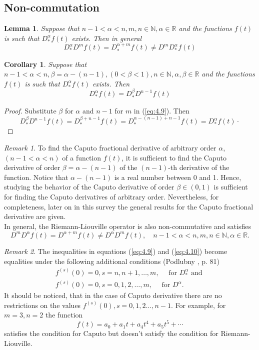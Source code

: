\documentclass[a4paper,14pt,oneside]{book}
\theoremstyle{plain}
\newtheorem{lem}[thm]{Lemma}
\newtheorem{cor}{Corollary}[thm]
\theoremstyle{definition}
\theoremstyle{remark}
\newtheorem{rmk}{Remark}[section]
\begin{document}
\begin{center}
\begin{flushleft}
{\subsection{Non-commutation}
\begin{lem}
Suppose that $n-1<\alpha<n, m, n \in \mathbb{N}, \alpha \in \mathbb{R}$ and the functions $f(t)$ is such that $D_{*}^{\alpha} f(t)$ exists. Then in general
\begin{equation}\label{eq:4.9}
D_{*}^{\alpha} D^{m} f(t)=D_{*}^{\alpha+m} f(t) \neq D^{m} D_{*}^{\alpha} f(t)
\end{equation}
\end{lem}
\begin{cor} 
Suppose that $n-1<\alpha<n, \beta=\alpha-(n-1),(0<\beta<1), n \in \mathbb{N}, \alpha, \beta \in \mathbb{R}$ and the functions $f(t)$ is such that $D_{*}^{\alpha} f(t)$ exists. Then
$$
D_{*}^{\alpha} f(t)=D_{*}^{\beta} D^{n-1} f(t)
$$
\end{cor}
\begin{proof}
Substitute $\beta$ for $\alpha$ and $n-1$ for $m$ in (\ref{eq:4.9}). Then
$$
D_{*}^{\beta} D^{n-1} f(t)=D_{*}^{\beta+n-1} f(t)=D_{*}^{\alpha-(n-1)+n-1} f(t)=D_{*}^{\alpha} f(t)\cdot 
$$
\end{proof}
\begin{rmk}
To find the Caputo fractional derivative of arbitrary order $\alpha$, $(n-1<\alpha<n)$ of a function $f(t)$, it is sufficient to find the Caputo derivative of order $\beta=\alpha-(n-1)$ of the $(n-1)$-th derivative of the function. Notice that $\alpha-(n-1)$ is a real number between 0 and 1. Hence, studying the behavior of the Caputo derivative of order $\beta \in(0,1)$ is sufficient for finding the Caputo derivatives of arbitrary order. Nevertheless, for completeness, later on in this survey the general results for the Caputo fractional derivative are given.\\
In general, the Riemann-Liouville operator is also non-commutative and satisfies
\begin{equation}\label{eq:4.10}
D^{m} D^{\alpha} f(t)=D^{\alpha+m} f(t) \neq D^{\alpha} D^{m} f(t), \quad n-1<\alpha<n, m, n \in \mathbb{N}, \alpha \in \mathbb{R} .
\end{equation}
\end{rmk}
\begin{rmk}
The inequalities in equations (\ref{eq:4.9}) and (\ref{eq:4.10}) become equalities under the following additional conditions (Podlubny \cite{bb22}, p. 81)
$$
\begin{array}{l}
f^{(s)}(0)=0, s=n, n+1, \ldots, m, \quad \text { for } D_{*}^{\alpha} \text { and } \\
f^{(s)}(0)=0, s=0,1,2, \ldots, m, \quad \text { for } D^{\alpha} .
\end{array}
$$
It should be noticed, that in the case of Caputo derivative there are no restrictions on the values $f^{(s)}(0), s=0,1,2 \ldots, n-1$. For example, for $m=3, n=2$ the function
$$
f(t)=a_{0}+a_{1} t+a_{4} t^{4}+a_{5} t^{5}+\cdots
$$
satisfies the condition for Caputo but doesn't satisfy the condition for Riemann-Liouville.
\end{rmk}

}
\end{flushleft}
\end{center}
\end{document}
